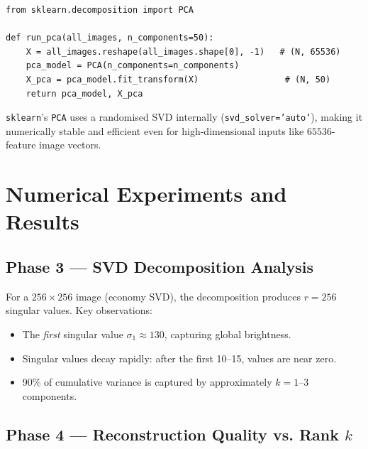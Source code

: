 \documentclass[11pt,a4paper]{article}
\theoremstyle{definition}
\begin{document}
\begin{lstlisting}[caption={PCA execution in \texttt{src/analysis.py}}]
from sklearn.decomposition import PCA

def run_pca(all_images, n_components=50):
    X = all_images.reshape(all_images.shape[0], -1)   # (N, 65536)
    pca_model = PCA(n_components=n_components)
    X_pca = pca_model.fit_transform(X)                 # (N, 50)
    return pca_model, X_pca
\end{lstlisting}

\noindent \texttt{sklearn}'s \texttt{PCA} uses a randomised SVD internally
(\texttt{svd\_solver='auto'}), making it numerically stable and efficient even
for high-dimensional inputs like $65536$-feature image vectors.


\section{Numerical Experiments and Results}

\subsection{Phase 3 --- SVD Decomposition Analysis}

For a $256\times 256$ image (economy SVD), the decomposition produces
$r = 256$ singular values. Key observations:
\begin{itemize}[nosep]
  \item The \emph{first} singular value $\sigma_1 \approx 130$, capturing global
        brightness.
  \item Singular values decay rapidly: after the first 10--15, values are near
        zero.
  \item 90\% of cumulative variance is captured by approximately $k = 1$--$3$
        components.
\end{itemize}

\subsection{Phase 4 --- Reconstruction Quality vs. Rank $k$}
\end{document}
